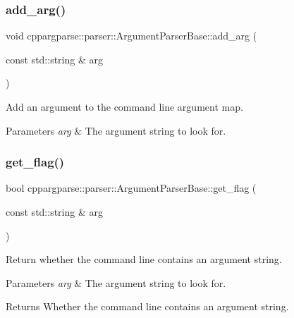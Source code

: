 \subsubsection{\texorpdfstring{add\+\_\+arg()}{add\_arg()}}
{\footnotesize\ttfamily void cppargparse\+::parser\+::\+Argument\+Parser\+Base\+::add\+\_\+arg (\begin{DoxyParamCaption}\item[{const std\+::string \&}]{arg }\end{DoxyParamCaption})\hspace{0.3cm}{\ttfamily [inline]}}



Add an argument to the command line argument map. 


\begin{DoxyParams}{Parameters}
{\em arg} & The argument string to look for. \\
\hline
\end{DoxyParams}
\mbox{\label{classcppargparse_1_1parser_1_1ArgumentParserBase_ac0b74272352f73058e35119c5b8a54fb}} 
\subsubsection{\texorpdfstring{get\+\_\+flag()}{get\_flag()}}
{\footnotesize\ttfamily bool cppargparse\+::parser\+::\+Argument\+Parser\+Base\+::get\+\_\+flag (\begin{DoxyParamCaption}\item[{const std\+::string \&}]{arg }\end{DoxyParamCaption})\hspace{0.3cm}{\ttfamily [inline]}}



Return whether the command line contains an argument string. 


\begin{DoxyParams}{Parameters}
{\em arg} & The argument string to look for.\\
\hline
\end{DoxyParams}
\begin{DoxyReturn}{Returns}
Whether the command line contains an argument string. 
\end{DoxyReturn}
\mbox{\label{classcppargparse_1_1parser_1_1ArgumentParserBase_a9b716b70f52707633faccdc3de63641c}} 

